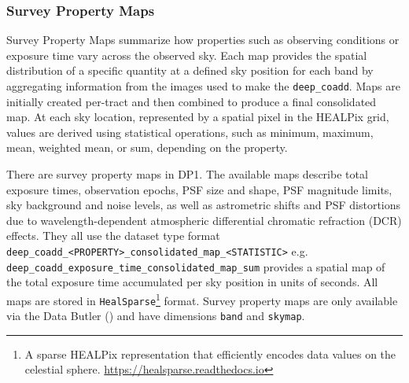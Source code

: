 \subsubsection{Survey Property Maps}
Survey Property Maps summarize how properties such as observing conditions or exposure time vary across the observed sky.
Each map provides the spatial distribution of a specific quantity at a defined sky position for each band by aggregating information from the images used to make the \texttt{deep\_coadd}.
Maps are initially created per-\gls{tract} and then combined to produce a final consolidated map.
At each sky location, represented by a spatial pixel in the \gls{HEALPix} grid, values are derived using statistical operations, such as minimum, maximum, mean, weighted mean, or sum, depending on the property.

There are \nsurveypropertymaps survey property maps in \gls{DP1}.
The available maps describe total exposure times, observation epochs, PSF size and \gls{shape}, PSF magnitude limits, sky background and noise levels, as well as astrometric shifts and PSF distortions due to wavelength-dependent atmospheric differential chromatic refraction (DCR) effects.
They all use the dataset type  format \texttt{deep\_coadd\_<PROPERTY>\_consolidated\_map\_<STATISTIC>}
e.g. \texttt{deep\_coadd\_exposure\_time\_consolidated\_map\_sum} provides a spatial map of the total exposure time accumulated per
sky position in units of seconds.
All maps are stored in \texttt{HealSparse}\footnote{A sparse \gls{HEALPix}
representation that efficiently encodes data values on the celestial sphere. \url{https://healsparse.readthedocs.io}}\citep{2005ApJ...622..759G} format.
Survey property maps are only available via the Data \gls{Butler} () and  have dimensions \texttt{band} and \texttt{skymap}.

